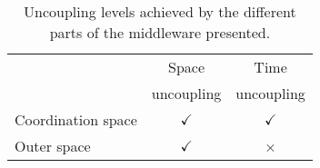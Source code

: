 
\begin{savenotes} %
  \begin{table}[htbp]
    \caption{Uncoupling levels achieved by the different parts of the middleware presented.}
    \begin{center}
      \begin{tabular}{lcc}
	\hline
	~ & Space &	Time \\
	~ & uncoupling & uncoupling \\
	\hline
	Coordination space & $\checkmark$ & $\checkmark$ \\
	Outer space & $\checkmark$ & × \\
	\hline
      \end{tabular}
    \end{center}
    \label{tab:middleware_coordinationprop}
  \end{table}
\end{savenotes}